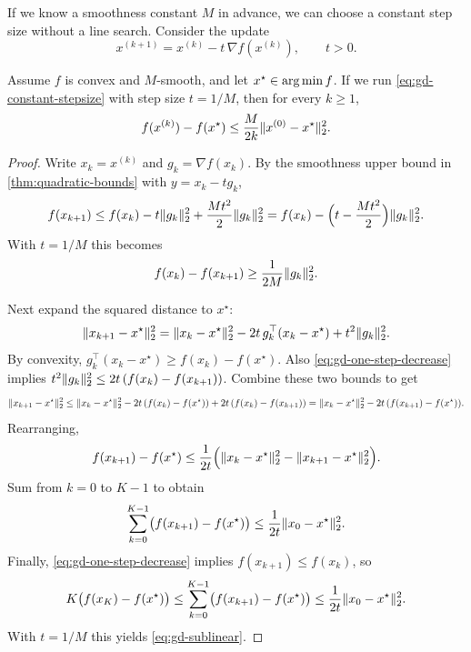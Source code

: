 If we know a smoothness constant $M$ in advance, we can choose a constant step size without a line search.
Consider the update
\begin{equation}
  x^{(k+1)} = x^{(k)} - t\,\nabla f(x^{(k)}),
  \qquad t>0.
  \label{eq:gd-constant-stepsize}
\end{equation}

\begin{theorem}
\label{thm:gd-sublinear}
Assume $f$ is convex and $M$-smooth, and let $x^\star \in \operatorname*{arg\,min} f$.
If we run \eqref{eq:gd-constant-stepsize} with step size $t=1/M$, then for every $k\ge 1$,
\begin{equation}
  f(x^{(k)}) - f(x^\star) \le \frac{M}{2k}\lVert x^{(0)}-x^\star\rVert_2^2.
  \label{eq:gd-sublinear}
\end{equation}
\end{theorem}
\begin{proof}
Write $x_k=x^{(k)}$ and $g_k=\nabla f(x_k)$.
By the smoothness upper bound in \cref{thm:quadratic-bounds} with $y=x_k-tg_k$,
\[
  f(x_{k+1})
  \le f(x_k) - t\lVert g_k\rVert_2^2 + \frac{Mt^2}{2}\lVert g_k\rVert_2^2
  = f(x_k) - \Bigl(t-\frac{Mt^2}{2}\Bigr)\lVert g_k\rVert_2^2.
\]
With $t=1/M$ this becomes
\begin{equation}
  f(x_k)-f(x_{k+1}) \ge \frac{1}{2M}\lVert g_k\rVert_2^2.
  \label{eq:gd-one-step-decrease}
\end{equation}

Next expand the squared distance to $x^\star$:
\[
  \lVert x_{k+1}-x^\star\rVert_2^2
  = \lVert x_k-x^\star\rVert_2^2 - 2t\,g_k^\top(x_k-x^\star) + t^2\lVert g_k\rVert_2^2.
\]
By convexity, $g_k^\top(x_k-x^\star)\ge f(x_k)-f(x^\star)$.
Also \eqref{eq:gd-one-step-decrease} implies $t^2\lVert g_k\rVert_2^2 \le 2t\,(f(x_k)-f(x_{k+1}))$.
Combine these two bounds to get
\[
  \lVert x_{k+1}-x^\star\rVert_2^2
  \le \lVert x_k-x^\star\rVert_2^2 - 2t\,(f(x_k)-f(x^\star)) + 2t\,(f(x_k)-f(x_{k+1}))
  = \lVert x_k-x^\star\rVert_2^2 - 2t\,(f(x_{k+1})-f(x^\star)).
\]
Rearranging,
\[
  f(x_{k+1})-f(x^\star)
  \le \frac{1}{2t}\Bigl(\lVert x_k-x^\star\rVert_2^2 - \lVert x_{k+1}-x^\star\rVert_2^2\Bigr).
\]
Sum from $k=0$ to $K-1$ to obtain
\[
  \sum_{k=0}^{K-1}\bigl(f(x_{k+1})-f(x^\star)\bigr)
  \le \frac{1}{2t}\lVert x_0-x^\star\rVert_2^2.
\]
Finally, \eqref{eq:gd-one-step-decrease} implies $f(x_{k+1})\le f(x_k)$, so
\[
  K\bigl(f(x_K)-f(x^\star)\bigr)
  \le \sum_{k=0}^{K-1}\bigl(f(x_{k+1})-f(x^\star)\bigr)
  \le \frac{1}{2t}\lVert x_0-x^\star\rVert_2^2.
\]
With $t=1/M$ this yields \eqref{eq:gd-sublinear}.
\end{proof}

